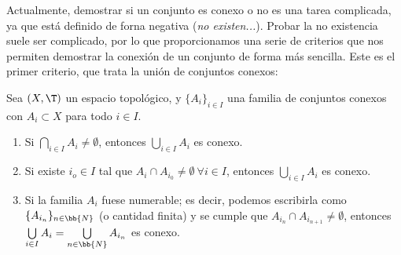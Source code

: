 Actualmente, demostrar si un conjunto es conexo o no es una tarea complicada, ya que está definido de forna negativa (\emph{no existen...}).
Probar la no existencia suele ser complicado, por lo que proporcionamos una serie de criterios que nos permiten demostrar la conexión de un conjunto de forma más sencilla.
Este es el primer criterio, que trata la unión de conjuntos conexos:
\begin{prop}\label{prop:UnionConexos}
    Sea $(X,\T)$ un espacio topológico, y $\{A_i\}_{i\in I}$ una familia de conjuntos conexos con $A_i\subset X$ para todo $i\in I$.
    \begin{enumerate}
        \item Si $\bigcap\limits_{i\in I}A_i\neq \emptyset$, entonces $\bigcup\limits_{i\in I}A_i$ es conexo.
        \item Si existe $i_o\in I$ tal que $A_i\cap A_{i_0}\neq \emptyset~ \forall i\in I$, entonces $\bigcup\limits_{i\in I}A_i$ es conexo.
        \item Si la familia $A_i$ fuese numerable; es decir, podemos escribirla como $\{A_{i_n}\}_{n\in \bb{N}}$ (o cantidad finita) y se cumple que $A_{i_n}\cap A_{i_{n+1}}\neq \emptyset$, entonces $\bigcup\limits_{i\in I}A_i= \bigcup\limits_{n\in \bb{N}}A_{i_n}$ es conexo.
    \end{enumerate}
\end{prop}
